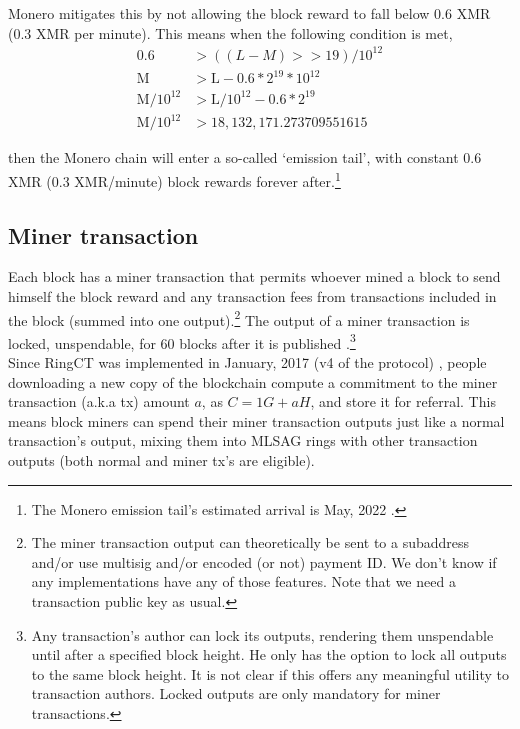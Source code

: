 Monero mitigates this by not allowing the block reward to fall below 0.6 XMR (0.3 XMR per minute). This means when the following condition is met,\vspace{.2cm}
\begin{align*}
               0.6 &> ((L-M) >> 19)/10^{12} \\
        \textrm{M} &> \textrm{L} - 0.6*2^{19}*10^{12} \\
\textrm{M}/10^{12} &> \textrm{L}/10^{12} - 0.6*2^{19} \\
\textrm{M}/10^{12} &> 18,132,171.273709551615
\end{align*}

then the Monero chain will enter a so-called `emission tail', with constant 0.6 XMR (0.3 XMR/minute) block rewards forever after.\footnote{The Monero emission tail's estimated arrival is May, 2022 \cite{monero-tail-emission}.}


\subsection{Miner transaction}
\label{subsec:miner-transaction} %

Each block has a miner transaction that permits whoever mined a block to send himself the block reward and any transaction fees from transactions included in the block (summed into one output).\footnote{The miner transaction output can theoretically be sent to a subaddress and/or use multisig and/or encoded (or not) payment ID. We don't know if any implementations have any of those features. Note that we need a transaction public key as usual.} The output of a miner transaction is locked, unspendable, for 60 blocks after it is published \cite{transaction-lock}.\footnote{Any transaction's author can lock its outputs, rendering them unspendable until after a specified block height. He only has the option to lock all outputs to the same block height. It is not clear if this offers any meaningful utility to transaction authors. Locked outputs are only mandatory for miner transactions.}\\%

Since RingCT was implemented in January, 2017 (v4 of the protocol) \cite{ringct-dates}, people downloading a new copy of the blockchain compute a commitment to the miner transaction (a.k.a tx) amount $a$, as $C = 1G + aH$, and store it for referral. This means block miners can spend their miner transaction outputs just like a normal transaction's output, mixing them into MLSAG rings with other transaction outputs (both normal and miner tx's are eligible).\\

